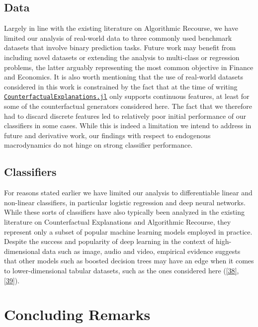 \documentclass[conference,final,]{IEEEtran}
\theoremstyle{definition}
\theoremstyle{definition}
\theoremstyle{definition}
\theoremstyle{definition}
\theoremstyle{remark}
\begin{document}
\hypertarget{limit-data}{%
\subsection{Data}\label{limit-data}}

Largely in line with the existing literature on Algorithmic Recourse, we have limited our analysis of real-world data to three commonly used benchmark datasets that involve binary prediction tasks. Future work may benefit from including novel datasets or extending the analysis to multi-class or regression problems, the latter arguably representing the most common objective in Finance and Economics. It is also worth mentioning that the use of real-world datasets considered in this work is constrained by the fact that at the time of writing \href{https://github.com/pat-alt/CounterfactualExplanations.jl}{\texttt{CounterfactualExplanations.jl}} only supports continuous features, at least for some of the counterfactual generators considered here. The fact that we therefore had to discard discrete features led to relatively poor initial performance of our classifiers in some cases. While this is indeed a limitation we intend to address in future and derivative work, our findings with respect to endogenous macrodynamics do not hinge on strong classifier performance.

\hypertarget{classifiers}{%
\subsection{Classifiers}\label{classifiers}}

For reasons stated earlier we have limited our analysis to differentiable linear and non-linear classifiers, in particular logistic regression and deep neural networks. While these sorts of classifiers have also typically been analyzed in the existing literature on Counterfactual Explanations and Algorithmic Recourse, they represent only a subset of popular machine learning models employed in practice. Despite the success and popularity of deep learning in the context of high-dimensional data such as image, audio and video, empirical evidence suggests that other models such as boosted decision trees may have an edge when it comes to lower-dimensional tabular datasets, such as the ones considered here (\protect\hyperlink{ref-borisov2021deep}{{[}38{]}}, \protect\hyperlink{ref-grinsztajn2022why}{{[}39{]}}).

\hypertarget{conclusion}{%
\section{Concluding Remarks}\label{conclusion}}
\end{document}
